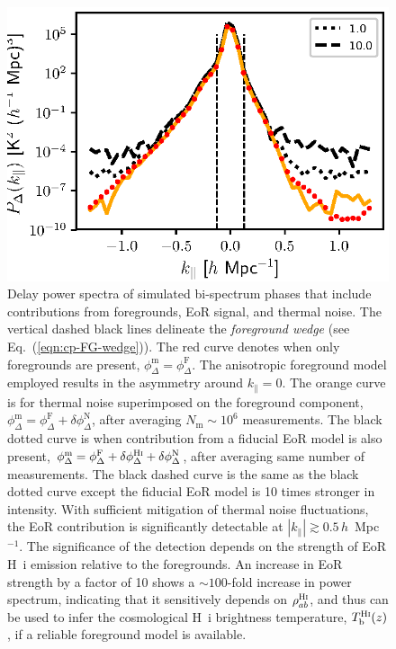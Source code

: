 \documentclass[
reprint,
superscriptaddress,
amsmath,
amssymb,
aps,
prd
]{revtex4-1}
\begin{document}
\begin{figure}[htb]
\includegraphics[width=\linewidth]{cpdps_150MHz_nsamples_1048576}
\caption{Delay power spectra of simulated bi-spectrum phases that include contributions from foregrounds, EoR signal, and thermal noise. The vertical dashed black lines delineate the {\it foreground wedge} (see Eq.~(\ref{eqn:cp-FG-wedge})). The red curve denotes when only foregrounds are present, $\phi_\Delta^\textrm{m}=\phi_\Delta^\textrm{F}$. The anisotropic foreground model employed \cite{thy15a} results in the asymmetry around $k_\parallel=0$. The orange curve is for thermal noise superimposed on the foreground component, $\phi_\Delta^\textrm{m}=\phi_\Delta^\textrm{F}+\delta\phi_\Delta^\textrm{N}$, after averaging $N_\textrm{m} \sim 10^6$ measurements. The black dotted curve is when contribution from a fiducial EoR model is also present, $\phi_\Delta^\textrm{m}=\phi_\Delta^\textrm{F}+\delta\phi_\Delta^\textrm{H{\sc i}}+\delta\phi_\Delta^\textrm{N}$, after averaging same number of measurements. The black dashed curve is the same as the black dotted curve except the fiducial EoR model is 10 times stronger in intensity. With sufficient mitigation of thermal noise fluctuations, the EoR contribution is significantly detectable at $|k_\parallel| \gtrsim 0.5\,h$~Mpc$^{-1}$. The significance of the detection depends on the strength of EoR H~{\sc i} emission relative to the foregrounds. An increase in EoR strength by a factor of 10 shows a $\sim 100$-fold increase in power spectrum, indicating that it sensitively depends on $\rho_{ab}^\textrm{H{\sc i}}$, and thus can be used to infer the cosmological H~{\sc i} brightness temperature, $T_\textrm{b}^\textrm{H{\sc i}}(z)$, if a reliable foreground model is available. \label{fig:cpdps}}
\end{figure}
\end{document}
